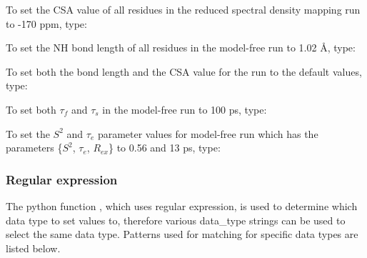 To set the CSA value of all residues in the reduced spectral density mapping  run 
 to
-170 ppm, type:





To set the NH bond length  of all residues in the model-free run 
 to 1.02 \AA,
type:





To set both the bond length  and the CSA value for the run 
 to the default values, type:




To set both $\tau_f$ and $\tau_s$ in the model-free run 
 to 100 ps, type:





To set the $S^2$ and $\tau_e$ parameter values for model-free run 
 which has the parameters
\{$S^2$, $\tau_e$, $R_{ex}$\} to 0.56 and 13 ps, type:








\subsubsection{Regular expression}

The python  function 
, which uses regular expression,  is used to determine which data
type to set values to, therefore various data\_type strings can be used to select the same
data type.  Patterns used for matching for specific data types are listed below.

